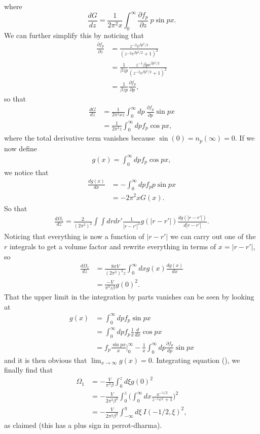 \documentclass[11pt,twosided]{article}
\begin{document}
where
\begin{equation}
\frac{dG}{dz} = \frac{1}{2\pi^2x}\int_0^{\infty} \frac{\partial f_p}{\partial z} \ p \sin px.
\end{equation}
We can further simplify this by noticing that
\begin{align}
\frac{\partial f_p}{\partial z} &= \frac{z^{-2} e^{\beta p^2/2}}{(z^{-2} e^{\beta p^2/2}+1)^2}\\
							   &= \frac{1}{ \beta zp}\frac{z^{-1} \beta p e^{\beta p^2/2}}{(z^{-2} e^{\beta p^2/2}+1)^2}\\
							   &= \frac{1}{\beta zp}\frac{\partial f_p}{\partial p},
\end{align}
so that
\begin{align}
\frac{dG}{dz} &= \frac{1}{2\pi^2xz}\int_0^{\infty} d p \ \frac{\partial f_p}{\partial p} \sin px \\
			  &= \frac{1}{2\pi^2z}\int_0^{\infty} d p f_p \cos px,
\end{align}
where the total derivative term vanishes because $\sin (0) = n_p(\infty) = 0$.
If we now define
\begin{align}
g(x) = \int_0^{\infty} d p f_p \cos px,
\end{align}
we notice that
\begin{align}
\frac{dg(x)}{dx} &= -\int_0^{\infty} d p f_p p \sin px\\
				&= -2\pi^2 x G(x).
\end{align}
So that
\begin{align}
\frac{d\Omega_1}{dz} = \frac{2}{(2\pi^2)^2}\int \int dr dr' \frac{1}{|r-r'|^2} g(|r-r'|) \frac{dg(|r-r'|)}{d|r-r'|}.
\end{align}
Noticing that everything is now a function of $|r-r'|$ we can carry out one of the $r$ integrals to get a volume factor and rewrite everything in terms of $x = |r-r'|$, so
\begin{align}
\frac{d\Omega_1}{dz} &= \frac{8\pi V}{(2\pi^2)^2z} \int_0^{\infty} d x g(x) \frac{dg(x)}{dx}\\
					 &= \frac{-V}{\pi^3z\beta} g(0)^2.
\end{align}
That the upper limit in the integration by parts vanishes can be seen by looking at
\begin{align}
g(x) &= \int_0^{\infty} dp f_p \sin px\\
								&= \int_0^{\infty} dp f_p \frac{1}{x}\frac{d}{dx}\cos px\\
								&= f_p \frac{\sin px}{x}\big|_0^{\infty} - \frac{1}{x}\int_0^\infty d p \frac{\partial f_p}{d p} \sin px
\end{align}
and it is then obvious that $\lim_{x\rightarrow\infty} g(x) = 0$.
Integrating equation (), we finally find that
\begin{align}
\Omega_1 &= -\frac{V}{\pi^3\beta}\int_0^{z} d\xi g(0)^2\\
 		 &= -\frac{V}{2\pi^3\beta^2}\int_0^{z} \Big(\int_0^{\infty}dx\frac{x^{-1/2} }{z^{-1} e^x + 1}\Big)^2\\
 		 &= -\frac{V}{2\pi^3\beta^2}\int_{-\infty}^{\eta} d\xi \ I(-1/2, \xi)^2,
\end{align}
as claimed (this has a plus sign in perrot-dharma).
\end{document}
